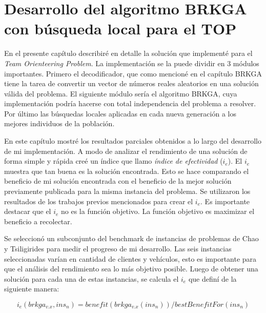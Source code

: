 
\chapter{Desarrollo del algoritmo BRKGA con búsqueda local para el TOP}

En el presente capítulo describiré en detalle la solución que implementé para el \textit{Team Orienteering Problem}. La implementación se la puede dividir en 3 módulos importantes. Primero el decodificador, que como mencioné en el capítulo BRKGA tiene la tarea de convertir un vector de números reales aleatorios en una solución válida del problema. El siguiente módulo sería el algoritmo BRKGA, cuya implementación podría hacerse con total independencia del problema a resolver. Por último las búsquedas locales aplicadas en cada nueva generación a los mejores individuos de la población. 

\bigskip

En este capítulo mostré los resultados parciales obtenidos a lo largo del desarrollo de mi implementación. A modo de analizar el rendimiento de una solución de forma simple y rápida creé un índice que llamo \textit{índice de efectividad} ($i_e$). El $i_e$ muestra que tan buena es la solución encontrada. Esto se hace comparando el beneficio de mi solución encontrada con el beneficio de la mejor solución previamente publicada para la misma instancia del problema. Se utilizaron los resultados de los trabajos previos mencionados para crear el $i_e$. Es importante destacar que el $i_e$ no es la función objetivo. La función objetivo es maximizar el beneficio a recolectar. 

\bigskip

Se seleccionó un subconjunto del benchmark de instancias de problemas de Chao y Tsiligirides \cite{IntancesChaoTsiligirides} para medir el progreso de mi desarrollo. Las seis instancias seleccionadas varían en cantidad de clientes y vehículos, esto es importante para que el análisis del rendimiento sea lo más objetivo posible. Luego de obtener una solución para cada una de estas instancias, se calcula el $i_e$ que definí de la siguiente manera:

\begin{equation}
i_e(brkga_{v.x},ins_n) = benefit(brkga_{v.x}(ins_n)) / bestBenefitFor(ins_n) \label{eq:iefectividad}
\end{equation}

\bigskip

